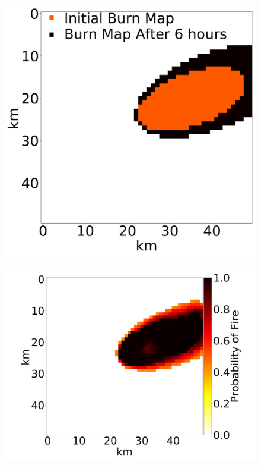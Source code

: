 \documentclass[smallcondensed]{svjour3}     %
\begin{document}
\begin{figure}[htbp]
  \centering
	\includegraphics[height=0.17\textheight]{exampleFusedFire0.png}
	~
	\includegraphics[height=0.17\textheight]{exampleNetworkProcessed0.png}
	~

\end{figure}
\end{document}

